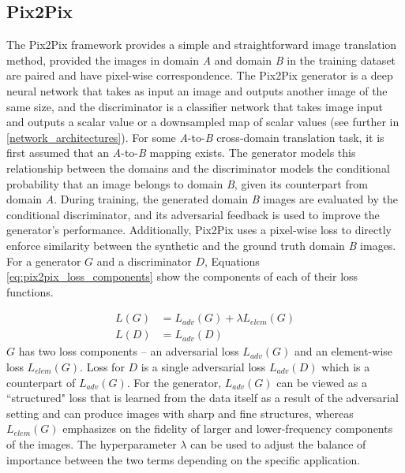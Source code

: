 \subsection{Pix2Pix}
\label{pix2pix}
The Pix2Pix framework provides a simple and straightforward image translation method, provided the images in domain \textit{A} and domain \textit{B} in the training dataset are paired and have pixel-wise correspondence. The Pix2Pix generator is a deep neural network that takes as input an image and outputs another image of the same size, and the discriminator is a classifier network that takes image input and outputs a scalar value or a downsampled map of scalar values (see further in \ref{network_architectures}). For some \textit{A}-to-\textit{B} cross-domain translation task, it is first assumed that an \textit{A}-to-\textit{B} mapping exists. The generator models this relationship between the domains and the discriminator models the conditional probability that an image belongs to domain \textit{B}, given its counterpart from domain \textit{A}. During training, the generated domain \textit{B} images are evaluated by the conditional discriminator, and its adversarial feedback is used to improve the generator's performance. Additionally, Pix2Pix uses a pixel-wise loss to directly enforce similarity between the synthetic and the ground truth domain \textit{B} images. For a generator $G$ and a discriminator $D$, Equations \ref{eq:pix2pix_loss_components} show the components of each of their loss functions. 

\begin{equation}
    \begin{aligned}
    L(G) &= L_{adv}(G) + \lambda L_{elem}(G) \\
    L(D) &= L_{adv}(D)
    \end{aligned}
    \label{eq:pix2pix_loss_components}
\end{equation}
$G$ has two loss components -- an adversarial loss $L_{adv}(G)$ and an element-wise loss $L_{elem}(G)$. Loss for $D$ is a single adversarial loss $L_{adv}(D)$ which is a counterpart of $L_{adv}(G)$. For the generator, $L_{adv}(G)$ can be viewed as a ``structured" loss that is learned from the data itself as a result of the adversarial setting and can produce images with sharp and fine structures, whereas $L_{elem}(G)$ emphasizes on the fidelity of larger and lower-frequency components of the images. The hyperparameter $\lambda$ can be used to adjust the balance of importance between the two terms depending on the specific application.

